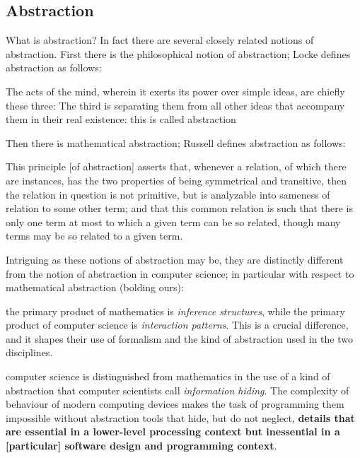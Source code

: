 \subsection{Abstraction}\label{subsec:abstraction}
What is abstraction?
In fact there are several closely related notions of abstraction.
First there is the philosophical notion of abstraction;
Locke defines abstraction as follows:
\begin{displayquote}
    The acts of the mind, wherein it exerts its power over simple ideas, are chiefly these three: \textellipsis
    The third is separating them from all other ideas that accompany them in their real existence: this is called abstraction \textellipsis
\end{displayquote}
Then there is mathematical abstraction;
Russell defines abstraction as follows:
\begin{displayquote}
    This principle [of abstraction] asserts that, whenever a relation, of which there are instances, has the two properties of being symmetrical and transitive, then the relation in question is not primitive, but is analyzable into sameness of relation to some other term;
    and that this common relation is such that there is only one term at most to which a given term can be so related, though many terms may be so related to a given term.
\end{displayquote}
Intriguing as these notions of abstraction may be, they are distinctly different from the notion of abstraction in computer science;
in particular with respect to mathematical abstraction (bolding ours):
\begin{displayquote}
    \textellipsis the primary product of mathematics is \textit{inference structures}, while the primary product of computer science is \textit{interaction patterns}.
    This is a crucial difference, and it shapes their use of formalism and the kind of abstraction used in the two disciplines.

    \vspace{4pt}

    \textellipsis computer science is distinguished from mathematics in the use of a kind of abstraction that computer scientists call \textit{information hiding}.
    The complexity of behaviour of modern computing devices makes the task of programming them impossible without abstraction tools that hide, but do not neglect, \textbf{details that are essential in a lower-level processing context but inessential in a [particular] software design and programming context}.
\end{displayquote}
